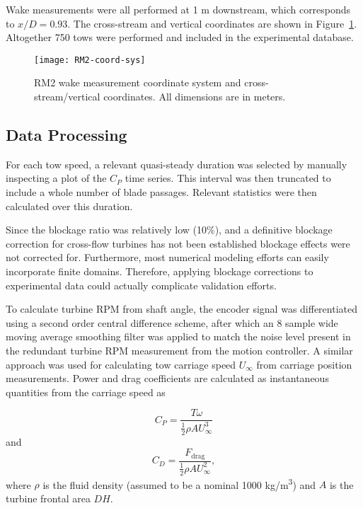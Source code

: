 Wake measurements were all performed at 1 m downstream, which corresponds to
$x/D = 0.93$. The cross-stream and vertical coordinates are shown in
Figure~\ref{fig:coordinates}. Altogether 750 tows were performed and included in
the experimental database.

\begin{figure}
    \texttt{[image: RM2-coord-sys]}
    
    \caption{RM2 wake measurement coordinate system and cross-stream/vertical
        coordinates. All dimensions are in meters.}
    
    \label{fig:coordinates}
\end{figure}


\subsection{Data Processing}

For each tow speed, a relevant quasi-steady duration was selected by manually
inspecting a plot of the $C_P$ time series. This interval was then truncated to
include a whole number of blade passages. Relevant statistics were then
calculated over this duration.

Since the blockage ratio was relatively low (10\%), and a definitive blockage
correction for cross-flow turbines has not been established \cite{Cavagnaro2014}
blockage effects were not corrected for. Furthermore, most numerical modeling
efforts can easily incorporate finite domains. Therefore, applying blockage
corrections to experimental data could actually complicate validation efforts.

To calculate turbine RPM from shaft angle, the encoder signal was differentiated
using a second order central difference scheme, after which an 8 sample wide
moving average smoothing filter was applied to match the noise level present in
the redundant turbine RPM measurement from the motion controller. A similar
approach was used for calculating tow carriage speed $U_\infty$ from carriage
position measurements. Power and drag coefficients are calculated as
instantaneous quantities from the carriage speed as

\begin{equation}
    C_P = \frac{T \omega}{\frac{1}{2} \rho A U_\infty^3}
\end{equation}
and
\begin{equation}
    C_D = \frac{F_\mathrm{drag}}{\frac{1}{2} \rho A U_\infty^2},
\end{equation}
where $\rho$ is the fluid density (assumed to be a nominal 1000
kg/m\textsuperscript{3}) and $A$ is the turbine frontal area $DH$.

